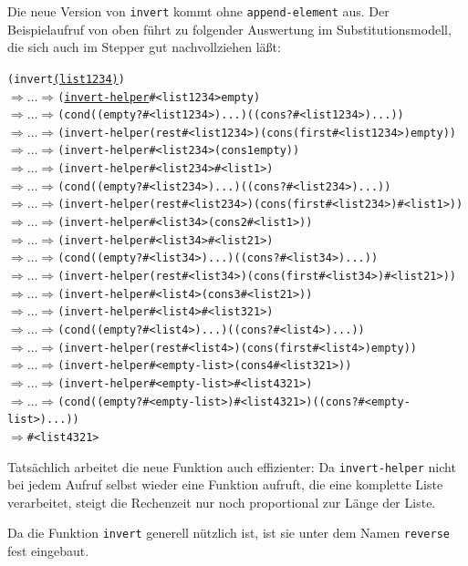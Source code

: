 Die neue Version von \texttt{invert} kommt ohne
\texttt{append-element} aus.  Der Beispielaufruf von oben führt zu
folgender Auswertung im Substitutionsmodell, die sich auch im Stepper
gut nachvollziehen läßt:
%
\begin{alltt}\small
(invert \underline{(list 1 2 3 4)})
\(\Longrightarrow\ldots\Longrightarrow\) (\underline{invert-helper} #<list 1 2 3 4> empty)
\(\Longrightarrow\ldots\Longrightarrow\) (cond ((empty? #<list 1 2 3 4>) ...) ((cons? #<list 1 2 3 4>) ...))
\(\Longrightarrow\ldots\Longrightarrow\) (invert-helper (rest #<list 1 2 3 4>) (cons (first #<list 1 2 3 4>) empty))
\(\Longrightarrow\ldots\Longrightarrow\) (invert-helper #<list 2 3 4> (cons 1 empty))
\(\Longrightarrow\ldots\Longrightarrow\) (invert-helper #<list 2 3 4> #<list 1>)
\(\Longrightarrow\ldots\Longrightarrow\) (cond ((empty? #<list 2 3 4>) ...) ((cons? #<list 2 3 4>) ...))
\(\Longrightarrow\ldots\Longrightarrow\) (invert-helper (rest #<list 2 3 4>) (cons (first #<list 2 3 4>) #<list 1>))
\(\Longrightarrow\ldots\Longrightarrow\) (invert-helper #<list 3 4> (cons 2 #<list 1>))
\(\Longrightarrow\ldots\Longrightarrow\) (invert-helper #<list 3 4> #<list 2 1>)
\(\Longrightarrow\ldots\Longrightarrow\) (cond ((empty? #<list 3 4>) ...) ((cons? #<list 3 4>) ...))
\(\Longrightarrow\ldots\Longrightarrow\) (invert-helper (rest #<list 3 4>) (cons (first #<list 3 4>) #<list 2 1>))
\(\Longrightarrow\ldots\Longrightarrow\) (invert-helper #<list 4> (cons 3 #<list 2 1>))
\(\Longrightarrow\ldots\Longrightarrow\) (invert-helper #<list 4> #<list 3 2 1>)
\(\Longrightarrow\ldots\Longrightarrow\) (cond ((empty? #<list 4>) ...) ((cons? #<list 4>) ...))
\(\Longrightarrow\ldots\Longrightarrow\) (invert-helper (rest #<list 4>) (cons (first #<list 4>) empty))
\(\Longrightarrow\ldots\Longrightarrow\) (invert-helper #<empty-list> (cons 4 #<list 3 2 1>))
\(\Longrightarrow\ldots\Longrightarrow\) (invert-helper #<empty-list> #<list 4 3 2 1>)
\(\Longrightarrow\ldots\Longrightarrow\) (cond ((empty? #<empty-list>) #<list 4 3 2 1>) ((cons? #<empty-list>) ...))
\(\Longrightarrow\) #<list 4 3 2 1>
\end{alltt}
%
Tatsächlich arbeitet die neue Funktion auch effizienter: Da
\texttt{invert-helper} nicht bei jedem Aufruf selbst wieder eine Funktion
aufruft, die eine komplette Liste verarbeitet, steigt die Rechenzeit
nur noch proportional zur Länge der Liste.

Da die Funktion \texttt{invert} generell nützlich ist, ist sie unter
dem Namen \texttt{reverse} fest eingebaut.

